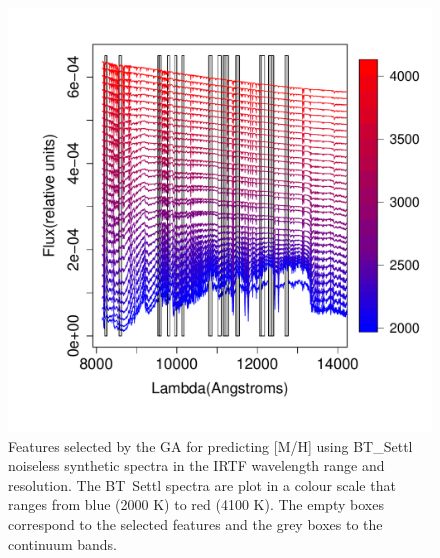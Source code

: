 \begin {figure}
 \centering
  \includegraphics[scale=0.55]{figs/BT-spectraAtIRTF-Inf-mh}
  \caption{Features selected by the GA for predicting [M/H] using
    BT\_Settl noiseless synthetic spectra in the IRTF wavelength range
    and resolution. The BT\ Settl spectra are plot in a colour scale
    that ranges from blue (2000 K) to red (4100 K). The empty boxes
    correspond to the selected features and the grey boxes to the
    continuum bands.}
\label{fig:irtf-teff}
\end {figure}


